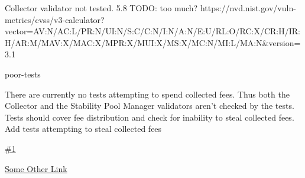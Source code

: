 \vuln
    { %
      Collector validator not tested.
    }
    { %
      5.8 TODO: too much?
    }
    { %
    https://nvd.nist.gov/vuln-metrics/cvss/v3-calculator?vector=AV:N/AC:L/PR:N/UI:N/S:C/C:N/I:N/A:N/E:U/RL:O/RC:X/CR:H/IR:H/AR:M/MAV:X/MAC:X/MPR:X/MUI:X/MS:X/MC:N/MI:L/MA:N&version=3.1
    }
    { %
    \item poor-tests
    }
    { %
    There are currently no tests attempting to spend collected fees. Thus both the Collector and the Stability Pool Manager validators aren't checked by the tests.
    Tests should cover fee distribution and check for inability to steal collected fees.
    }
    { %
      Add tests attempting to steal collected fees  
    }
    { %
    \item\href{github.com}{\#1}
    \item\href{github.com}{Some Other Link}
    }
